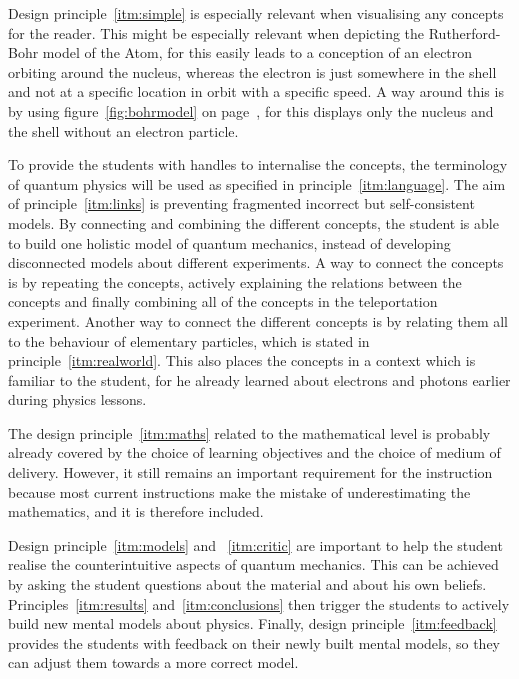 \documentclass[11pt,twoside]{report} %
\begin{document}
Design principle~\ref{itm:simple} is especially relevant when visualising any concepts for the reader. This might be especially relevant when depicting the Rutherford-Bohr model of the Atom, for this easily leads to a conception of an electron orbiting around the nucleus, whereas the electron is just somewhere in the shell and not at a specific location in orbit with a specific speed. A way around this is by using figure~\ref{fig:bohrmodel} on page~\pageref{fig:bohrmodel}, for this displays only the nucleus and the shell without an electron particle.

To provide the students with handles to internalise the concepts, the terminology of quantum physics will be used as specified in principle~\ref{itm:language}. The aim of principle~\ref{itm:links} is preventing fragmented incorrect but self-consistent models. By connecting and combining the different concepts, the student is able to build one holistic model of quantum mechanics, instead of developing disconnected models about different experiments. A way to connect the concepts is by repeating the concepts, actively explaining  the relations between the concepts and finally combining all of the concepts in the teleportation experiment. Another way to connect the different concepts is by relating them all to the behaviour of elementary particles, which is stated in principle~\ref{itm:realworld}. This also places the concepts in a context which is familiar to the student, for he already learned about electrons and photons earlier during physics lessons.

The design principle~\ref{itm:maths} related to the mathematical level is probably already covered by the choice of learning objectives and the choice of medium of delivery. However, it still remains an important requirement for the instruction because most current instructions make the mistake of underestimating the mathematics, and it is therefore included.

Design principle~\ref{itm:models} and ~\ref{itm:critic} are important to help the student realise the counterintuitive aspects of quantum mechanics. This can be achieved by asking the student questions about the material and about his own beliefs. Principles~\ref{itm:results} and~\ref{itm:conclusions} then trigger the students to actively build new mental models about physics. Finally, design principle~\ref{itm:feedback} provides the students with feedback on their newly built mental models, so they can adjust them towards a more correct model.
\end{document}
